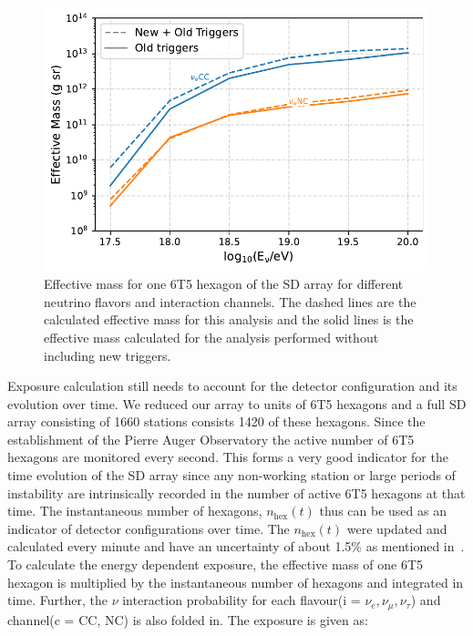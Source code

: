 \begin{figure}[t!]
  \centering
  \includegraphics[width=14.5cm]{thesis_figures/ExpLimits/EffMass_comp_all_new_sim_optim.pdf}
  \caption{Effective mass for one 6T5 hexagon of the SD array for different neutrino flavors and interaction channels. The dashed lines are the calculated effective mass for this analysis and the solid lines is the effective mass calculated for the analysis performed without including new triggers.}
  \label{fig:EffMass_flavors_comp}
\end{figure}
Exposure calculation still needs to account for the detector configuration and its evolution over time. We reduced our array to units of 6T5 hexagons and a full SD array consisting of 1660 stations consists 1420 of these hexagons. Since the establishment of the Pierre Auger Observatory the active number of 6T5 hexagons are monitored every second. This forms a very good indicator for the time evolution of the SD array since any non-working station or large periods of instability are intrinsically recorded in the number of active 6T5 hexagons at that time. The instantaneous number of hexagons, $n_{\text{hex}}(t)$ thus can be used as an indicator of detector configurations over time. The $n_{\text{hex}}(t)$ were updated and calculated every minute and have an uncertainty of about 1.5\% as mentioned in~\cite{PierreAuger:2010zof}. To calculate the energy dependent exposure, the effective mass of one 6T5 hexagon is multiplied by the instantaneous number of hexagons and integrated in time. Further, the $\nu$ interaction probability for each flavour(i = $\nu_e, \nu_{\mu}, \nu_{\tau}$) and channel(c = CC, NC) is also folded in. The exposure is given as:

